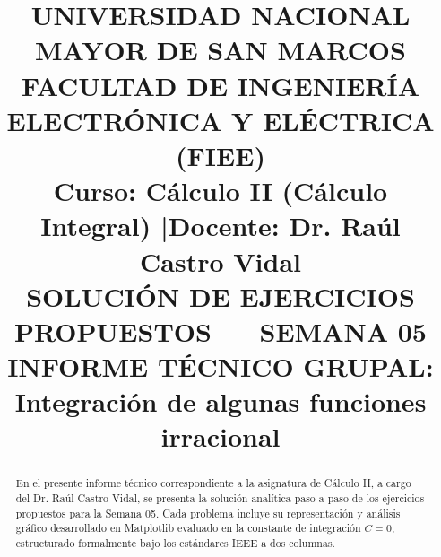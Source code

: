 \documentclass[conference]{IEEEtran}
\newcommand{\NumeroSemana}{05}
\newcommand{\TemaSemana}{Integración de algunas funciones irracional}
\begin{document}
	
	\title{UNIVERSIDAD NACIONAL MAYOR DE SAN MARCOS\\
		\Large FACULTAD DE INGENIERÍA ELECTRÓNICA Y ELÉCTRICA (FIEE)\\
		\vspace{0.3cm}
		\large \textbf{Curso:} Cálculo II (Cálculo Integral) \quad|\quad \textbf{Docente:} Dr. Raúl Castro Vidal\\
		\vspace{0.4cm}
		\huge SOLUCIÓN DE EJERCICIOS PROPUESTOS --- SEMANA \NumeroSemana\\
		\LARGE INFORME TÉCNICO GRUPAL: \TemaSemana}
	
	\author{
		\and
		\and
		\vspace{0.4cm}
		\and
		\and
		\and
	}
	
	\maketitle
	
	\begin{abstract}
		En el presente informe técnico correspondiente a la asignatura de Cálculo II, a cargo del Dr. Raúl Castro Vidal, se presenta la solución analítica paso a paso de los ejercicios propuestos para la Semana \NumeroSemana. Cada problema incluye su representación y análisis gráfico desarrollado en Matplotlib evaluado en la constante de integración $C=0$, estructurado formalmente bajo los estándares IEEE a dos columnas.
	\end{abstract}
	
\end{document}

